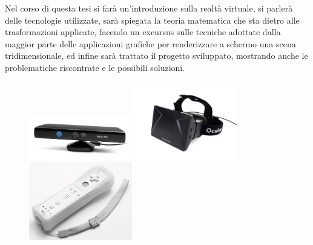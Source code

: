 Nel corso di questa tesi si farà un'introduzione sulla realtà virtuale, si parlerà delle tecnologie utilizzate, sarà spiegata la teoria matematica che sta dietro alle trasformazioni applicate, facendo un excursus sulle tecniche adottate dalla maggior parte delle applicazioni grafiche per renderizzare a schermo una scena tridimensionale, ed infine sarà trattato il progetto sviluppato, mostrando anche le problematiche riscontrate e le possibili soluzioni.

\begin{figure}[htbp]
\centering
\includegraphics[width=0.4\textwidth]{images/intro/kinect.png}
\includegraphics[width=0.4\textwidth]{images/intro/oculus-rift.jpg}
\includegraphics[width=0.4\textwidth]{images/intro/wii.jpg}
\end{figure}
